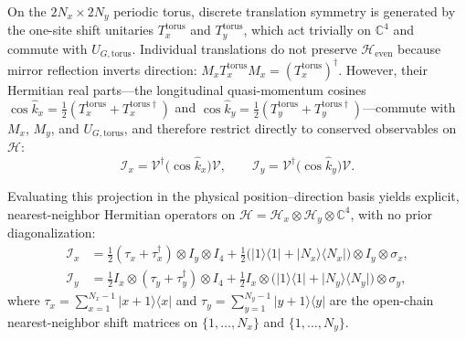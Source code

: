 \documentclass[11pt,a4paper,oneside]{report}
\newcommand{\ket}[1]{\lvert #1\rangle}
\newcommand{\bra}[1]{\langle #1\rvert}
\newcommand{\HH}{\mathcal H}
\newcommand{\Id}{I}
\numberwithin{equation}{chapter}
\begin{document}
On the \(2N_x\times2N_y\) periodic torus, discrete translation symmetry is
generated by the one-site shift unitaries \(T_x^{\mathrm{torus}}\) and
\(T_y^{\mathrm{torus}}\), which act trivially on \(\mathbb C^4\) and
commute with \(U_{G,\mathrm{torus}}\). Individual translations do not
preserve \(\HH_{\mathrm{even}}\) because mirror reflection inverts
direction: \(M_x T_x^{\mathrm{torus}} M_x=(T_x^{\mathrm{torus}})^\dagger\).
However, their Hermitian real parts---the longitudinal quasi-momentum cosines
\(\cos\hat k_x=\tfrac12(T_x^{\mathrm{torus}}+T_x^{\mathrm{torus}\dagger})\)
and
\(\cos\hat k_y=\tfrac12(T_y^{\mathrm{torus}}+T_y^{\mathrm{torus}\dagger})\)---commute
with \(M_x\), \(M_y\), and \(U_{G,\mathrm{torus}}\), and therefore restrict
directly to conserved observables on \(\HH\):
\begin{equation}
\mathcal I_x=\mathcal V^\dagger\big(\cos\hat k_x\big)\mathcal V,
\qquad
\mathcal I_y=\mathcal V^\dagger\big(\cos\hat k_y\big)\mathcal V.
\end{equation}

Evaluating this projection in the physical position--direction basis yields
explicit, nearest-neighbor Hermitian operators on
\(\HH=\HH_x\otimes\HH_y\otimes\mathbb C^4\), with no prior diagonalization:
\begin{align}
\mathcal I_x&=\frac12(\tau_x+\tau_x^\dagger)\otimes\Id_y\otimes\Id_4
+\frac12\big(\ket1\bra1+\ket{N_x}\bra{N_x}\big)\otimes\Id_y\otimes\sigma_x,
\label{eq:Ixdef}\\
\mathcal I_y&=\frac12\Id_x\otimes(\tau_y+\tau_y^\dagger)\otimes\Id_4
+\frac12\Id_x\otimes\big(\ket1\bra1+\ket{N_y}\bra{N_y}\big)\otimes\sigma_y,
\label{eq:Iydef}
\end{align}
where \(\tau_x=\sum_{x=1}^{N_x-1}\ket{x+1}\bra x\) and
\(\tau_y=\sum_{y=1}^{N_y-1}\ket{y+1}\bra y\) are the open-chain nearest-neighbor
shift matrices on \(\{1,\ldots,N_x\}\) and \(\{1,\ldots,N_y\}\).
\end{document}
